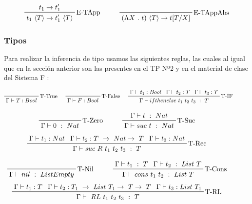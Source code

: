 \documentclass[12pt, titlepage, a4paper]{article}
\begin{document}
\begin{displaymath}
    \prftree[r]{E-TApp}{t_1 \rightarrow t_1'}{t_1 \ \langle T \rangle \rightarrow t_1' \ \langle T \rangle} \hspace{1cm}
    \prftree[r]{E-TAppAbs}{(\Lambda X \ . \ t)\ \langle T \rangle \rightarrow t[T/X]}
\end{displaymath}

\subsubsection{Tipos}
Para realizar la inferencia de tipo usamos las siguientes reglas, las cuales al igual que en la sección anterior son las
presentes en el TP Nº2 \cite{tp2:lambdaCalculoSimpleTipado} y en el material de clase del Sistema F \cite{ALP:Polimorfismo}:

\begin{displaymath}
    \prftree[r]{T-True}{\Gamma \vdash T: Bool} \hspace{0.5cm}
    \prftree[r]{T-False}{\Gamma \vdash F:  Bool} \hspace{0.5cm}  
    \prftree[r]{T-IF}{\Gamma \vdash t_1 : Bool}{\Gamma \vdash t_2 : T}{\Gamma \vdash t_3 : T}{\Gamma \vdash ifthenelse \ t_1 \ t_2 \ t_3 \ : \ T} \hspace{1cm}
\end{displaymath}

\begin{displaymath}
    \prftree[r]{T-Zero}{\Gamma \vdash 0 \ : \ Nat} \hspace{1cm}
    \prftree[r]{T-Suc}{\Gamma \vdash t \ : \ Nat}{\Gamma \vdash suc \ t \ : \ Nat} \hspace{1cm}
\end{displaymath}
\begin{displaymath}
    \prftree[r]{T-Rec}{\Gamma \vdash t_1 : Nat}{\Gamma \vdash t_2 : T \ \rightarrow \ Nat \rightarrow \ T}{\Gamma \vdash t_3 : Nat}{\Gamma \vdash suc \ R \ t_1 \ t_2 \ t_3 \ : \ T} \hspace{1cm}
\end{displaymath}

\begin{displaymath}
    \prftree[r]{T-Nil}{\Gamma \vdash nil \ : \ ListEmpty} \hspace{1cm}
    \prftree[r]{T-Cons}{\Gamma \vdash t_1 \ : \ T}{\Gamma \vdash t_2 \ : \ List \ T}{\Gamma \vdash cons \ t_1 \ t_2 \ : \ List \ T} \hspace{1cm}
\end{displaymath}
\begin{displaymath}
    \prftree[r]{T-RL}{\Gamma \vdash t_1 : T}{\Gamma \vdash t_2 : T_1 \ \rightarrow \ List \ T_1 \rightarrow \ T \rightarrow \ T}{\Gamma \vdash t_3 : List \ T_1}{\Gamma \vdash \ RL \ t_1 \ t_2 \ t_3 \ : \ T} \hspace{1cm}
\end{displaymath}
\end{document}
